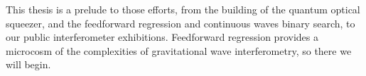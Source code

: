 This thesis is a prelude to those efforts, from the building of the quantum optical squeezer, and the feedforward regression and continuous waves binary search, to our public interferometer exhibitions.   
Feedforward regression provides a microcosm of the complexities of gravitational wave interferometry, so there we will begin.


            
%

%
%
%
  

